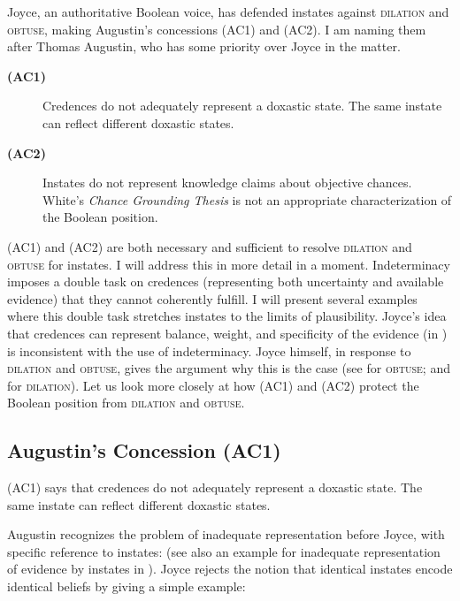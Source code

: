 \documentclass[11pt]{article}
\begin{document}
Joyce, an authoritative Boolean voice, has defended instates against
\textsc{dilation} and \textsc{obtuse}, making Augustin's concessions
(AC1) and (AC2). I am naming them after Thomas Augustin, who has some
priority over Joyce in the matter.

\begin{description}
\item[{\bf (AC1)}] Credences do not adequately represent a doxastic
  state. The same instate can reflect different doxastic states.
\item[{\bf (AC2)}] Instates do not represent knowledge claims about
  objective chances. White's \emph{Chance Grounding Thesis} is not an
  appropriate characterization of the Boolean position.
\end{description}

(AC1) and (AC2) are both necessary and sufficient to resolve
\textsc{dilation} and \textsc{obtuse} for instates. I will address
this in more detail in a moment. Indeterminacy imposes a double task
on credences (representing both uncertainty and available evidence)
that they cannot coherently fulfill. I will present several examples
where this double task stretches instates to the limits of
plausibility. Joyce's idea that credences can represent balance,
weight, and specificity of the evidence (in ) is
inconsistent with the use of indeterminacy. Joyce himself, in response
to \textsc{dilation} and \textsc{obtuse}, gives the argument why this
is the case (see  for \textsc{obtuse}; and
 for \textsc{dilation}). Let us look
more closely at how (AC1) and (AC2) protect the Boolean position from
\textsc{dilation} and \textsc{obtuse}.

\subsection{Augustin's Concession (AC1)}
\label{jj1}

(AC1) says that credences do not adequately represent a doxastic state.
The same instate can reflect different doxastic states.

Augustin recognizes the problem of inadequate representation before
Joyce, with specific reference to instates:   (see also an example for
inadequate representation of evidence by instates in
). Joyce rejects the notion that
identical instates encode identical beliefs by giving a simple
example:
\end{document}
